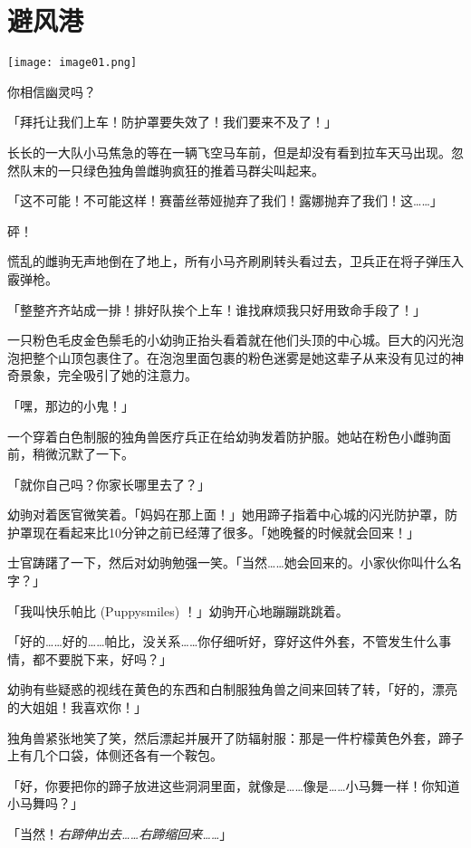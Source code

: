 \chapter{避风港}

\texttt{[image: image01.png]}

\begin{intro}
    你相信幽灵吗？
\end{intro}

「拜托让我们上车！防护罩要失效了！我们要来不及了！」

长长的一大队小马焦急的等在一辆飞空马车前，但是却没有看到拉车天马出现。忽然队末的一只绿色独角兽雌驹疯狂的推着马群尖叫起来。

「这不可能！不可能这样！赛蕾丝蒂娅抛弃了我们！露娜抛弃了我们！这……」

砰！

慌乱的雌驹无声地倒在了地上，所有小马齐刷刷转头看过去，卫兵正在将子弹压入霰弹枪。

「整整齐齐站成一排！排好队挨个上车！谁找麻烦我只好用致命手段了！」

一只粉色毛皮金色鬃毛的小幼驹正抬头看着就在他们头顶的中心城。巨大的闪光泡泡把整个山顶包裹住了。在泡泡里面包裹的粉色迷雾是她这辈子从来没有见过的神奇景象，完全吸引了她的注意力。

「嘿，那边的小鬼！」

一个穿着白色制服的独角兽医疗兵正在给幼驹发着防护服。她站在粉色小雌驹面前，稍微沉默了一下。

「就你自己吗？你家长哪里去了？」

幼驹对着医官微笑着。「妈妈在那上面！」她用蹄子指着中心城的闪光防护罩，防护罩现在看起来比10分钟之前已经薄了很多。「她晚餐的时候就会回来！」

士官踌躇了一下，然后对幼驹勉强一笑。「当然……她会回来的。小家伙你叫什么名字？」

「我叫快乐帕比 (Puppysmiles) ！」幼驹开心地蹦蹦跳跳着。

「好的……好的……帕比，没关系……你仔细听好，穿好这件外套，不管发生什么事情，都不要脱下来，好吗？」

幼驹有些疑惑的视线在黄色的东西和白制服独角兽之间来回转了转，「好的，漂亮的大姐姐！我喜欢你！」


独角兽紧张地笑了笑，然后漂起并展开了防辐射服：那是一件柠檬黄色外套，蹄子上有几个口袋，体侧还各有一个鞍包。

「好，你要把你的蹄子放进这些洞洞里面，就像是……像是……小马舞一样！你知道小马舞吗？」

「当然！\emph{右蹄伸出去……右蹄缩回来……}」

